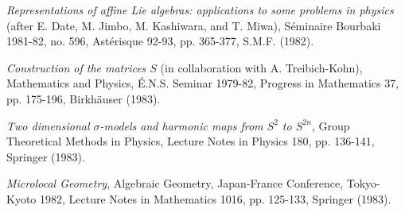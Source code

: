 \begin{description}
\item[{[33]}] \emph{Representations of affine Lie algebras: applications to
some problems in physics} (after E. Date, M. Jimbo, M. Kashiwara, and T. Miwa),
Séminaire Bourbaki 1981-82, no. 596, Astérisque 92-93, pp. 365-377,
S.M.F. (1982).

\item[{[34]}] \emph{Construction of the matrices $S$} (in collaboration with
A. Treibich-Kohn), Mathematics and Physics, É.N.S. Seminar 1979-82,
Progress in Mathematics 37, pp. 175-196, Birkhäuser (1983).

\item[{[35]}] \emph{Two dimensional $\sigma$-models and harmonic maps from
$S^2$ to $S^{2n}$}, Group Theoretical Methods in Physics,
Lecture Notes in Physics 180, pp. 136-141, Springer (1983).

\item[{[36]}] \emph{Microlocal Geometry}, Algebraic Geometry,
Japan-France Conference, Tokyo-Kyoto 1982, Lecture Notes in Mathematics 1016,
pp. 125-133, Springer (1983).
\end{description}


